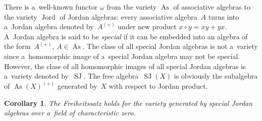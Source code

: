 \documentclass[11pt]{article}
\newtheorem{corollary}{Corollary}
\begin{document}
There is a~well-known functor $\omega $ from the variety $\operatorname{As}$ of associative algebras to the variety $\operatorname{Jord}$ of Jordan
algebras: every associative algebra~$A$ turns into a~Jordan algebra denoted by~$A^{(+)}$ under new product $x\circ y=xy + yx$.
A~Jordan algebra is said to be {\em special} if it can be embedded into an algebra of the form~$A^{(+)}$, $A\in \operatorname{As}$.
The class of all special Jordan algebras is not a~variety since a~homomorphic image of a~special Jordan algebra may not be special.
However, the class of all homomorphic images of all special Jordan algebras is a~variety denoted by~$\operatorname{SJ}$.
The free algebra~$\operatorname{SJ}(X)$ is obviously the subalgebra of $\operatorname{As}(X)^{(+)}$ generated by~$X$ with respect to Jordan product.

\begin{corollary}
The Freiheitssatz holds for the variety generated by special Jordan algebras over a~field of characteristic zero.
\end{corollary}
\end{document}
